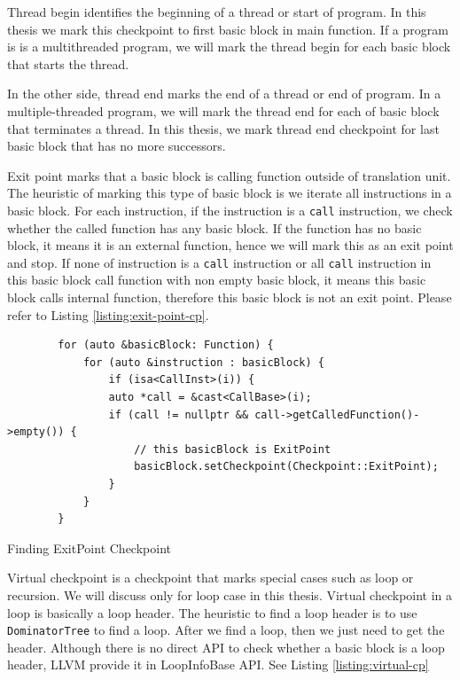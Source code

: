 Thread begin identifies the beginning of a thread or start of program. In this
thesis we mark this checkpoint to first basic block in main function. If a
program is is a multithreaded program, we will mark the thread begin for each
basic block that starts the thread.

In the other side, thread end marks the end of a thread or end of program. In a
multiple-threaded program, we will mark the thread end for each of basic block
that terminates a thread. In this thesis, we mark thread end checkpoint for last
basic block that has no more successors.

Exit point marks that a basic block is calling function outside of translation
unit. The heuristic of marking this type of basic block is we iterate all
instructions in a basic block. For each instruction, if the instruction is a
\texttt{call} instruction, we check whether the called function has any basic
block. If the function has no basic block, it means it is an external function,
hence we will mark this as an exit point and stop. If none of instruction is a
\texttt{call} instruction or all \texttt{call} instruction in this basic block
call function with non empty basic block, it means this basic block calls
internal function, therefore this basic block is not an exit point. Please refer
to Listing \ref{listing:exit-point-cp}.

\begin{listing}[htbp]
    \begin{verbatim}
        for (auto &basicBlock: Function) {
            for (auto &instruction : basicBlock) {
                if (isa<CallInst>(i)) {
                auto *call = &cast<CallBase>(i);
                if (call != nullptr && call->getCalledFunction()->empty()) {
                    // this basicBlock is ExitPoint
                    basicBlock.setCheckpoint(Checkpoint::ExitPoint);
                } 
            }
        } 
    \end{verbatim}
    \caption{Finding ExitPoint Checkpoint}    
    \label{listing:exit-point-cp}
\end{listing}

Virtual checkpoint is a checkpoint that marks special cases such as loop or
recursion. We will discuss only for loop case in this thesis. Virtual checkpoint
in a loop is basically a loop header. The heuristic to find a loop header is to
use \texttt{DominatorTree} to find a loop. After we find a loop, then we just
need to get the header. Although there is no direct API to check whether a basic
block is a loop header, LLVM provide it in LoopInfoBase API. See Listing
\ref{listing:virtual-cp}

